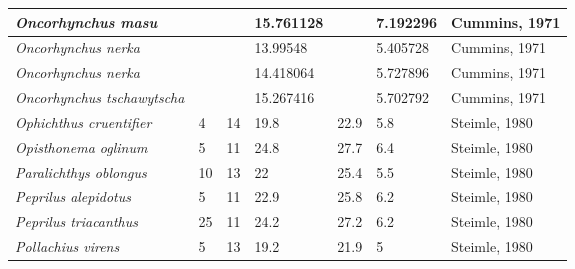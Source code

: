 \documentclass[a4paper]{article} %
\begin{document}
\begin{landscape}
\begin{longtable}[]{|l|p{1.8cm}|p{2cm}|p{2cm}|p{2.15cm}|p{1.9cm}|l|}
    \textit{Oncorhynchus masu}               &                              &                            & 15.761128                     &                                   & 7.192296                 & Cummins, 1971                 \\ \hline
    \textit{Oncorhynchus nerka}              &                              &                            & 13.99548                      &                                   & 5.405728                 & Cummins, 1971                 \\ \hline
    \textit{Oncorhynchus nerka}              &                              &                            & 14.418064                     &                                   & 5.727896                 & Cummins, 1971                 \\ \hline
    \textit{Oncorhynchus tschawytscha}       &                              &                            & 15.267416                     &                                   & 5.702792                 & Cummins, 1971                 \\ \hline
    \textit{Ophichthus cruentifier}          & 4                            & 14                         & 19.8                          & 22.9                              & 5.8                      & Steimle, 1980                \\ \hline
    \textit{Opisthonema oglinum}             & 5                            & 11                         & 24.8                          & 27.7                              & 6.4                      & Steimle, 1980                \\ \hline
    \textit{Paralichthys oblongus}           & 10                           & 13                         & 22                            & 25.4                              & 5.5                      & Steimle, 1980                \\ \hline
    \textit{Peprilus alepidotus}             & 5                            & 11                         & 22.9                          & 25.8                              & 6.2                      & Steimle, 1980                \\ \hline
    \textit{Peprilus triacanthus}            & 25                           & 11                         & 24.2                          & 27.2                              & 6.2                      & Steimle, 1980                \\ \hline
    \textit{Pollachius virens}               & 5                            & 13                         & 19.2                          & 21.9                              & 5                        & Steimle, 1980                \\ \hline

\end{longtable}
\end{landscape}
\end{document}
